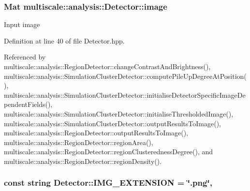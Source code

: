 \hypertarget{classmultiscale_1_1analysis_1_1Detector_a523830a6cfe409694ce8327c3c736fbd}{
\subsubsection[{image}]{\setlength{\rightskip}{0pt plus 5cm}Mat multiscale\-::analysis\-::\-Detector\-::image\hspace{0.3cm}{\ttfamily [protected]}}}\label{classmultiscale_1_1analysis_1_1Detector_a523830a6cfe409694ce8327c3c736fbd}
Input image 

Definition at line 40 of file Detector.\-hpp.



Referenced by multiscale\-::analysis\-::\-Region\-Detector\-::change\-Contrast\-And\-Brightness(), multiscale\-::analysis\-::\-Simulation\-Cluster\-Detector\-::compute\-Pile\-Up\-Degree\-At\-Position(), multiscale\-::analysis\-::\-Simulation\-Cluster\-Detector\-::initialise\-Detector\-Specific\-Image\-Dependent\-Fields(), multiscale\-::analysis\-::\-Simulation\-Cluster\-Detector\-::initialise\-Thresholded\-Image(), multiscale\-::analysis\-::\-Simulation\-Cluster\-Detector\-::output\-Results\-To\-Image(), multiscale\-::analysis\-::\-Region\-Detector\-::output\-Results\-To\-Image(), multiscale\-::analysis\-::\-Region\-Detector\-::region\-Area(), multiscale\-::analysis\-::\-Region\-Detector\-::region\-Clusteredness\-Degree(), and multiscale\-::analysis\-::\-Region\-Detector\-::region\-Density().

\hypertarget{classmultiscale_1_1analysis_1_1Detector_acc73b4fb215305ffd7f3d6df8807cc5e}{
\subsubsection[{I\-M\-G\-\_\-\-E\-X\-T\-E\-N\-S\-I\-O\-N}]{\setlength{\rightskip}{0pt plus 5cm}const string Detector\-::\-I\-M\-G\-\_\-\-E\-X\-T\-E\-N\-S\-I\-O\-N = \char`\"{}.png\char`\"{}\hspace{0.3cm}{\ttfamily [static]}, {\ttfamily [protected]}}}\label{classmultiscale_1_1analysis_1_1Detector_acc73b4fb215305ffd7f3d6df8807cc5e}


